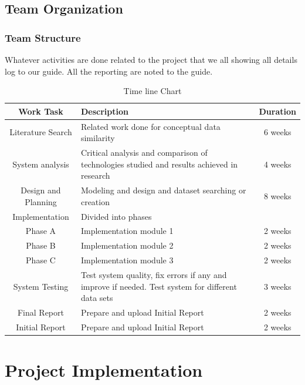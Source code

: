 \documentclass[oneside,a4paper,12pt]{report}
\begin{document}
{\begin{center}
\begin{figure}[!htbp]
	\end{figure}
\end{center} 
\section{Team Organization}
\subsection{Team Structure}
Whatever activities are done related to the project that we all showing all details log to our guide. All the reporting are noted to the guide.

\begin{table}[!htbp]
\begin{center}
\def\arraystretch{1.5}
  \begin{tabular}{| c | p{6cm} | c |}
\hline
\textbf{Work Task}	&\textbf{Description}	&\textbf{Duration} \\ \hline
Literature Search	&Related  work  done  for  conceptual  data similarity	&6 weeks \\ \hline
System analysis	&Critical analysis and comparison of technologies  studied  and  results  achieved  in research	&4 weeks \\ \hline
Design and Planning	&Modeling and design and dataset searching or creation	&8 weeks \\ \hline
Implementation	&Divided into phases	& \\ \hline
Phase A	&Implementation module 1	&2 weeks \\ \hline
Phase B	&Implementation module 2	&2 weeks \\ \hline
Phase C	&Implementation module 3	&2 weeks \\ \hline
System Testing	&Test system quality, fix errors if any and improve if needed. Test system for different data sets	&3 weeks \\ \hline
Final Report	&Prepare and upload Initial Report	&2 weeks \\ \hline
Initial Report	&Prepare and upload Initial Report	&2 weeks \\ \hline
\end{tabular}
 \caption {Time line Chart}
 \label{tab:Timeline Chart}
\end{center}
\end{table}
\newpage
\chapter{Project Implementation}
}
\end{document}
